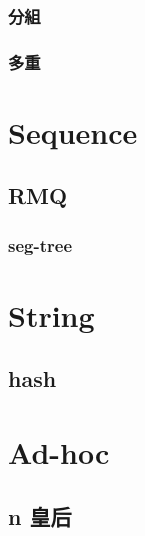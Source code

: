 \subsubsection{分組}


\subsubsection{多重}


\section{Sequence}

\subsection{RMQ}

\subsubsection{seg-tree}


% 

\section{String}

\subsection{hash}


\section{Ad-hoc}

\subsection{n 皇后}
